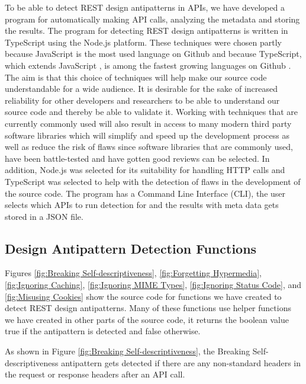 \documentclass[a4paper,12pt]{article}
\begin{document}
To be able to detect REST design antipatterns in APIs, we have developed a program for automatically making API calls, analyzing the metadata and storing the results. 
The program for detecting REST design antipatterns is written in TypeScript using the Node.js platform. These techniques were chosen partly because JavaScript is the most used language on Github \cite{octogithub} and because TypeScript, which extends JavaScript \cite{typescript}, is among the fastest growing languages on Github \cite{octogithub}. The aim is that this choice of techniques will help make our source code understandable for a wide audience. It is desirable for the sake of increased reliability for other developers and researchers to be able to understand our source code and thereby be able to validate it. Working with techniques that are currently commonly used will also result in access to many modern third party software libraries which will simplify and speed up the development process as well as reduce the risk of flaws since software libraries that are commonly used, have been battle-tested and have gotten good reviews can be selected. In addition, Node.js was selected for its suitability for handling HTTP calls \cite{nodejs} and TypeScript was selected to help with the detection of flaws \cite{typescript} in the development of the source code. 
The program has a Command Line Interface (CLI), the user selects which APIs to run detection for and the results with meta data gets stored in a JSON file. 

\subsection{Design Antipattern Detection Functions}

Figures \ref{fig:Breaking Self-descriptiveness}, \ref{fig:Forgetting Hypermedia}, \ref{fig:Ignoring Caching}, \ref{fig:Ignoring MIME Types}, \ref{fig:Ignoring Status Code}, and \ref{fig:Misusing Cookies} show the source code for functions we have created to detect REST design antipatterns. Many of these functions use helper functions we have created in other parts of the source code, it returns the boolean value true if the antipattern is detected and false otherwise.

As shown in Figure \ref{fig:Breaking Self-descriptiveness}, the Breaking Self-descriptiveness antipattern gets detected if there are any non-standard headers in the request or response headers after an API call.
\end{document}
